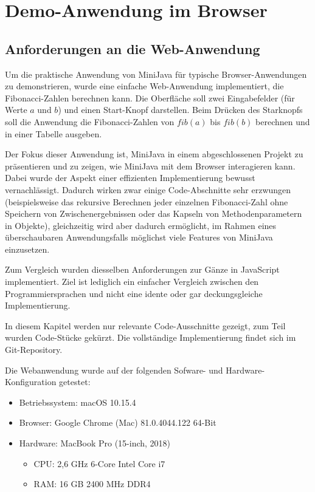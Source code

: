 \chapter{Demo-Anwendung im Browser}

\section{Anforderungen an die Web-Anwendung}

Um die praktische Anwendung von MiniJava für typische Browser-Anwendungen zu demonstrieren, wurde eine einfache Web-Anwendung implementiert, die Fibonacci-Zahlen berechnen kann. Die Oberfläche soll zwei Eingabefelder (für Werte $a$ und $b$) und einen Start-Knopf darstellen. Beim Drücken des Starknopfs soll die Anwendung die Fibonacci-Zahlen von $fib(a)$ bis $fib(b)$ berechnen und in einer Tabelle ausgeben.

Der Fokus dieser Anwendung ist, MiniJava in einem abgeschlossenen Projekt zu präsentieren und zu zeigen, wie MiniJava mit dem Browser interagieren kann. Dabei wurde der Aspekt einer effizienten Implementierung bewusst vernachlässigt. Dadurch wirken zwar einige Code-Abschnitte sehr erzwungen (beispielsweise das rekursive Berechnen jeder einzelnen Fibonacci-Zahl ohne Speichern von Zwischenergebnissen oder das Kapseln von Methodenparametern in Objekte), gleichzeitig wird aber dadurch ermöglicht, im Rahmen eines überschaubaren Anwendungsfalls möglichst viele Features von MiniJava einzusetzen. 

Zum Vergleich wurden diesselben Anforderungen zur Gänze in JavaScript implementiert. Ziel ist lediglich ein einfacher Vergleich zwischen den Programmiersprachen und nicht eine idente oder gar deckungsgleiche Implementierung.

In diesem Kapitel werden nur relevante Code-Ausschnitte gezeigt, zum Teil wurden Code-Stücke gekürzt. Die vollständige Implementierung findet sich im Git-Repository.

Die Webanwendung wurde auf der folgenden Sofware- und Hardware-Konfiguration getestet:
\begin{itemize}
    \item Betriebssystem: macOS 10.15.4
    \item Browser: Google Chrome (Mac) 81.0.4044.122 64-Bit
    \item Hardware: MacBook Pro (15-inch, 2018)
    \begin{itemize}
        \item CPU: 2,6 GHz 6-Core Intel Core i7
        \item RAM: 16 GB 2400 MHz DDR4
    \end{itemize}
\end{itemize}

